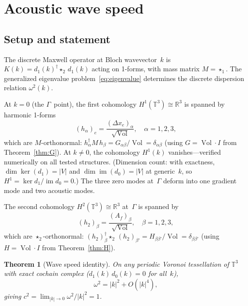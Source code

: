 \documentclass[preprint,12pt]{elsarticle}
\newtheorem{theorem}{Theorem}[section]
\DeclareMathOperator{\Vol}{Vol}
\DeclareMathOperator{\im}{im}
\begin{document}
\section{Acoustic wave speed}
\label{sec:theorem}

\subsection{Setup and statement}
\label{sec:setup}

The discrete Maxwell operator at Bloch wavevector~$k$ is
$K(k) = d_1(k)^\dagger \star_2\, d_1(k)$ acting on 1-forms, with mass
matrix $M = \star_1$. The generalized eigenvalue problem~\eqref{eq:eigenvalue}
determines the discrete dispersion relation $\omega^2(k)$.

At $k = 0$ (the $\Gamma$~point), the first cohomology
$H^1(\mathbb{T}^3) \cong \mathbb{R}^3$ is spanned by harmonic 1-forms
\begin{equation}
  (h_\alpha)_e = \frac{(\Delta x_e)_\alpha}{\sqrt{\Vol}}, \quad \alpha = 1,2,3,
  \label{eq:harm}
\end{equation}
which are $M$-orthonormal:
$h_\alpha^\dagger M\, h_\beta
  = G_{\alpha\beta}/\Vol = \delta_{\alpha\beta}$
(using $G = \Vol \cdot I$ from Theorem~\ref{thm:G}).
At $k \neq 0$, the cohomology $H^1(k)$ vanishes---verified numerically on
all tested structures. (Dimension count: with exactness,
$\dim\ker(d_1) = |V|$ and $\dim\im(d_0) = |V|$ at generic~$k$, so
$H^1 = \ker d_1 / \im d_0 = 0$.)
The three zero modes at~$\Gamma$ deform into one gradient mode and two
acoustic modes.

The second cohomology $H^2(\mathbb{T}^3) \cong \mathbb{R}^3$ at~$\Gamma$
is spanned by
\begin{equation}
  (h_2)_\beta = \frac{(A_f)_\beta}{\sqrt{\Vol}}, \quad \beta = 1,2,3,
  \label{eq:h2}
\end{equation}
which are $\star_2$-orthonormal:
$(h_2)_\beta^\dagger \star_2\, (h_2)_{\beta'}
  = H_{\beta\beta'}/\Vol = \delta_{\beta\beta'}$
(using $H = \Vol \cdot I$ from Theorem~\ref{thm:H}).

\begin{theorem}[Wave speed identity]
\label{thm:c_squared}
On any periodic Voronoi tessellation of\/ $\mathbb{T}^3$ with exact
cochain complex ($d_1(k)\, d_0(k) = 0$ for all~$k$),
\begin{equation}
  \omega^2 = |k|^2 + O(|k|^4),
  \label{eq:c_squared}
\end{equation}
giving $c^2 = \lim_{|k|\to 0} \omega^2/|k|^2 = 1$.
\end{theorem}
\end{document}
